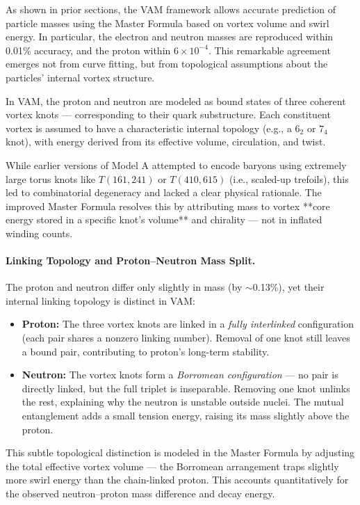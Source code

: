 As shown in prior sections, the VAM framework allows accurate prediction of particle masses using the Master Formula based on vortex volume and swirl energy. In particular, the electron and neutron masses are reproduced within 0.01\% accuracy, and the proton within $6 \times 10^{-4}$. This remarkable agreement emerges not from curve fitting, but from topological assumptions about the particles’ internal vortex structure.

In VAM, the proton and neutron are modeled as bound states of three coherent vortex knots — corresponding to their quark substructure. Each constituent vortex is assumed to have a characteristic internal topology (e.g., a $6_2$ or $7_4$ knot), with energy derived from its effective volume, circulation, and twist.

While earlier versions of Model A attempted to encode baryons using extremely large torus knots like $T(161,241)$ or $T(410,615)$ (i.e., scaled-up trefoils), this led to combinatorial degeneracy and lacked a clear physical rationale. The improved Master Formula resolves this by attributing mass to vortex **core energy stored in a specific knot’s volume** and chirality — not in inflated winding counts.

\paragraph{Linking Topology and Proton–Neutron Mass Split.}

The proton and neutron differ only slightly in mass (by $\sim$0.13\%), yet their internal linking topology is distinct in VAM:

\begin{itemize}
    \item \textbf{Proton:} The three vortex knots are linked in a \emph{fully interlinked} configuration (each pair shares a nonzero linking number). Removal of one knot still leaves a bound pair, contributing to proton’s long-term stability.

    \item \textbf{Neutron:} The vortex knots form a \emph{Borromean configuration} — no pair is directly linked, but the full triplet is inseparable. Removing one knot unlinks the rest, explaining why the neutron is unstable outside nuclei. The mutual entanglement adds a small tension energy, raising its mass slightly above the proton.
\end{itemize}

This subtle topological distinction is modeled in the Master Formula by adjusting the total effective vortex volume — the Borromean arrangement traps slightly more swirl energy than the chain-linked proton. This accounts quantitatively for the observed neutron–proton mass difference and decay energy.

